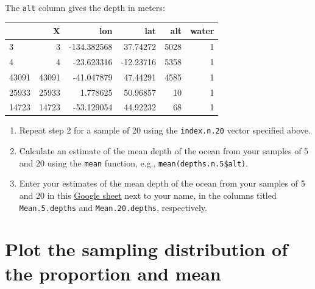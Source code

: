 \documentclass[letterpaper,12pt,twoside,]{pinp}
\begin{document}
\begin{Shaded}
\begin{Highlighting}[]
\NormalTok{ <-}\StringTok{ }\NormalTok{(}\NormalTok{, } \NormalTok{, } \NormalTok{)}
\end{Highlighting}
\end{Shaded}

\newpage

The \texttt{alt} column gives the depth in meters:

\begin{longtable}[]{@{}lrrrrr@{}}
\toprule
& X & lon & lat & alt & water\tabularnewline
\midrule
\endhead
3 & 3 & -134.382568 & 37.74272 & 5028 & 1\tabularnewline
4 & 4 & -23.623316 & -12.23716 & 5358 & 1\tabularnewline
43091 & 43091 & -41.047879 & 47.44291 & 4585 & 1\tabularnewline
25933 & 25933 & 1.778625 & 50.96857 & 10 & 1\tabularnewline
14723 & 14723 & -53.129054 & 44.92232 & 68 & 1\tabularnewline
\bottomrule
\end{longtable}

\begin{enumerate}
\def\labelenumi{\arabic{enumi}.}
\setcounter{enumi}{2}
\item
  Repeat step 2 for a sample of 20 using the \texttt{index.n.20} vector
  specified above.
\item
  Calculate an estimate of the mean depth of the ocean from your samples
  of 5 and 20 using the \texttt{mean} function, e.g.,
  \texttt{mean(depths.n.5\$alt)}.
\item
  Enter your estimates of the mean depth of the ocean from your samples
  of 5 and 20 in this
  \href{https://docs.google.com/spreadsheets/d/1Mnxeq9nQcTdQycZ7S_62fYFiNC5_a3fibsyodzfwO58/edit?usp=sharing}{Google
  sheet} next to your name, in the columns titled \texttt{Mean.5.depths}
  and \texttt{Mean.20.depths}, respectively.
\end{enumerate}

\hypertarget{plot-the-sampling-distribution-of-the-proportion-and-mean}{%
\section{Plot the sampling distribution of the proportion and
mean}\label{plot-the-sampling-distribution-of-the-proportion-and-mean}}
\end{document}
